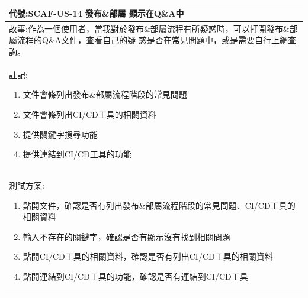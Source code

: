 \documentclass{report}
\begin{document}
\subsection*{}
\fontsize{12}{20}\selectfont
\begin{tabularx}{\textwidth}{|X|}
  \hline
  代號:SCAF-US-14 發布\&部屬 顯示在Q\&A中 \\
  \hline
  故事:作為一個使用者，當我對於發布\&部屬流程有所疑惑時，可以打開發布\&部屬流程的Q\&A文件，查看自己的疑
  惑是否在常見問題中，或是需要自行上網查詢。 \\
  \hline
  註記:
  \begin{enumerate}
    \item 文件會條列出發布\&部屬流程階段的常見問題
    \item 文件會條列出CI/CD工具的相關資料
    \item 提供關鍵字搜尋功能
    \item 提供連結到CI/CD工具的功能
  \end{enumerate} \\
  \hline
  測試方案:
  \begin{enumerate}
    \item 點開文件，確認是否有列出發布\&部屬流程階段的常見問題、CI/CD工具的相關資料
    \item 輸入不存在的關鍵字，確認是否有顯示沒有找到相關問題
    \item 點開CI/CD工具的相關資料，確認是否有列出CI/CD工具的相關資料
    \item 點開連結到CI/CD工具的功能，確認是否有連結到CI/CD工具
  \end{enumerate} \\
  \hline
\end{tabularx}
\end{document}
